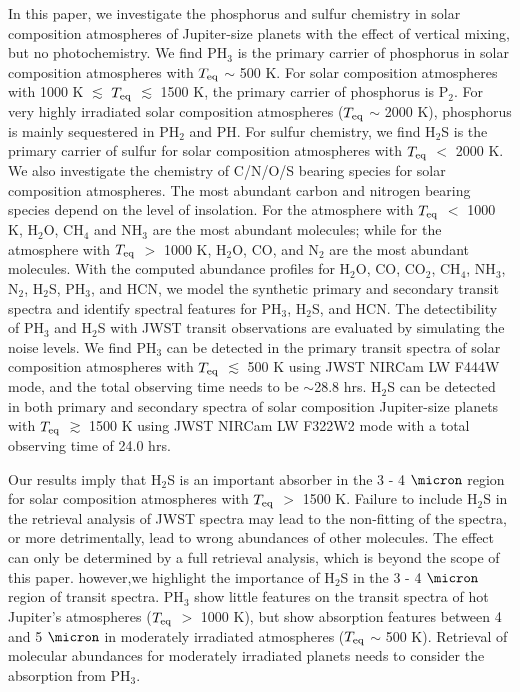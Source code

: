 \documentclass[twocolumn]{aastex61}
\begin{document}
In this paper, we investigate the phosphorus and sulfur chemistry in solar composition atmospheres of Jupiter-size planets with the effect of vertical mixing, but no photochemistry. We find PH$_3$ is the primary carrier of phosphorus in solar composition atmospheres with $T_{\rm eq}$ $\sim$ 500 K. For solar composition atmospheres with 1000 K $\lesssim$ $T_{\rm eq}$ $\lesssim$ 1500 K, the primary carrier of phosphorus is P$_2$. For very highly irradiated solar composition atmospheres ($T_{\rm eq}$ $\sim$ 2000 K), phosphorus is mainly sequestered in PH$_2$ and PH. For sulfur chemistry, we find H$_2$S is the primary carrier of sulfur for solar composition atmospheres with $T_{\rm eq}$ $<$ 2000 K. We also investigate the chemistry of C/N/O/S bearing species for solar composition atmospheres. The most abundant carbon and nitrogen bearing species depend on the level of insolation. For the atmosphere with $T_{\rm eq}$ $<$ 1000 K, H$_2$O, CH$_4$ and NH$_3$ are the most abundant molecules; while for the atmosphere with $T_{\rm eq}$ $>$ 1000 K, H$_2$O, CO, and N$_2$ are the most abundant molecules. With the computed abundance profiles for H$_2$O, CO, CO$_2$, CH$_4$, NH$_3$, N$_2$, H$_2$S, PH$_3$, and HCN, we model the synthetic primary and secondary transit spectra and identify spectral features for PH$_3$, H$_2$S, and HCN. The detectibility of PH$_3$ and H$_2$S with JWST transit observations are evaluated by simulating the noise levels. We find PH$_3$ can be detected in the primary transit spectra of solar composition atmospheres with $T_{\rm eq}$ $\lesssim$ 500 K using JWST NIRCam LW F444W mode, and the total observing time needs to be $\sim$28.8 hrs. H$_2$S can be detected in both primary and secondary spectra of solar composition Jupiter-size planets with $T_{\rm eq}$ $\gtrsim$ 1500 K using JWST NIRCam LW F322W2 mode with a total observing time of 24.0 hrs.

Our results imply that H$_2$S is an important absorber in the 3 - 4 $\micron$ region for solar composition atmospheres with $T_{\rm eq}$ $>$ 1500 K. Failure to include H$_2$S in the retrieval analysis of JWST spectra may lead to the non-fitting of the spectra, or more detrimentally, lead to wrong abundances of other molecules. The effect can only be determined by a full retrieval analysis, which is beyond the scope of this paper. however,we highlight the importance of H$_2$S in the 3 - 4 $\micron$ region of transit spectra. 
PH$_3$ show little features on the transit spectra of hot Jupiter's atmospheres ($T_{\rm eq}$ $>$ 1000 K), but show absorption features between 4 and 5 $\micron$ in moderately irradiated atmospheres ($T_{\rm eq}$ $\sim$ 500 K). Retrieval of molecular abundances for moderately irradiated planets needs to consider the absorption from PH$_3$. 
\end{document}
